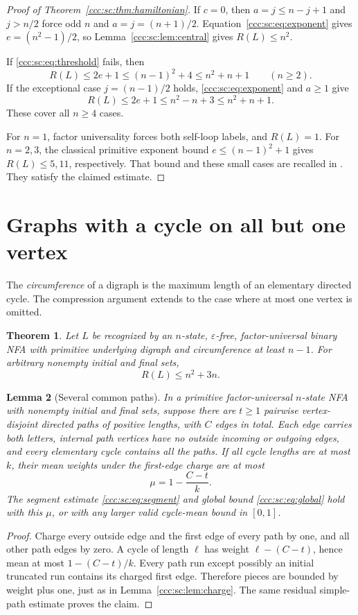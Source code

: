 \documentclass[11pt,letterpaper]{article}
\newtheorem{theorem}{Theorem}[section]
\newtheorem{lemma}[theorem]{Lemma}
\theoremstyle{definition}
\theoremstyle{remark}
\newcommand{\eps}{\varepsilon}
\begin{document}
\begin{proof}[Proof of Theorem~\ref{ccc:sc:thm:hamiltonian}]
If $c=0$, then $a=j\le n-j+1$ and $j>n/2$ force odd $n$ and $a=j=(n+1)/2$. Equation~\eqref{ccc:sc:eq:exponent} gives $e=(n^2-1)/2$, so Lemma~\ref{ccc:sc:lem:central} gives $R(L)\le n^2$.

If \eqref{ccc:sc:eq:threshold} fails, then
\[
 R(L)\le2e+1\le(n-1)^2+4\le n^2+n+1\qquad(n\ge2).
\]
If the exceptional case $j=(n-1)/2$ holds, \eqref{ccc:sc:eq:exponent} and $a\ge1$ give
\[
 R(L)\le2e+1\le n^2-n+3\le n^2+n+1.
\]
These cover all $n\ge4$ cases.

For $n=1$, factor universality forces both self-loop labels, and $R(L)=1$. For $n=2,3$, the classical primitive exponent bound $e\le(n-1)^2+1$ gives $R(L)\le5,11$, respectively. That bound and these small cases are recalled in \cite[Section~1]{KOV}. They satisfy the claimed estimate.
\end{proof}

\section{Graphs with a cycle on all but one vertex}\label{ccc:sc:sec:near}

The \emph{circumference} of a digraph is the maximum length of an elementary directed cycle. The compression argument extends to the case where at most one vertex is omitted.

\begin{theorem}\label{ccc:sc:thm:near}
Let $L$ be recognized by an $n$-state, $\eps$-free, factor-universal binary NFA with primitive underlying digraph and circumference at least $n-1$. For arbitrary nonempty initial and final sets,
\[
 \boxed{R(L)\le n^2+3n.}
\]
\end{theorem}

\begin{lemma}[Several common paths]\label{ccc:sc:lem:paths}
In a primitive factor-universal $n$-state NFA with nonempty initial and final sets, suppose there are $t\ge1$ pairwise vertex-disjoint directed paths of positive lengths, with $C$ edges in total. Each edge carries both letters, internal path vertices have no outside incoming or outgoing edges, and every elementary cycle contains all the paths. If all cycle lengths are at most $k$, their mean weights under the first-edge charge are at most
\[
 \mu=1-\frac{C-t}{k}.
\]
The segment estimate \eqref{ccc:sc:eq:segment} and global bound \eqref{ccc:sc:eq:global} hold with this $\mu$, or with any larger valid cycle-mean bound in $[0,1]$.
\end{lemma}
\begin{proof}
Charge every outside edge and the first edge of every path by one, and all other path edges by zero. A cycle of length $\ell$ has weight $\ell-(C-t)$, hence mean at most $1-(C-t)/k$. Every path run except possibly an initial truncated run contains its charged first edge. Therefore pieces are bounded by weight plus one, just as in Lemma~\ref{ccc:sc:lem:charge}. The same residual simple-path estimate proves the claim.
\end{proof}
\end{document}

